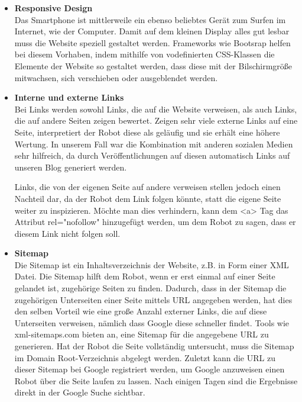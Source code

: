 {\begin{itemize}
      \item \textbf{Responsive Design}\\
        Das Smartphone ist mittlerweile ein ebenso beliebtes Gerät zum Surfen im Internet, wie der Computer. Damit auf dem kleinen Display alles gut lesbar muss die Website speziell
        gestaltet werden. Frameworks wie Bootsrap helfen bei diesem Vorhaben, indem mithilfe von vodefinierten CSS-Klassen die Elemente der Website so gestaltet werden, dass diese mit der
        Bilschirmgröße mitwachsen, sich verschieben oder ausgeblendet werden.

      \item \textbf{Interne und externe Links}\\
        Bei Links werden sowohl Links, die auf die Website verweisen, als auch Links, die auf andere Seiten zeigen bewertet.
        Zeigen sehr viele externe Links auf eine Seite, interpretiert der Robot diese als geläufig und sie erhält eine höhere Wertung. In unserem Fall war die Kombination mit anderen sozialen
        Medien sehr hilfreich, da durch Veröffentlichungen auf diesen automatisch Links auf unseren Blog generiert werden.

        Links, die von der eigenen Seite auf andere verweisen stellen jedoch einen Nachteil dar, da der Robot dem Link folgen könnte, statt die eigene Seite weiter zu inspizieren. Möchte man dies
        verhindern, kann dem <a> Tag das Attribut rel="nofollow" hinzugefügt werden, um dem Robot zu sagen, dass er diesem Link nicht folgen soll.

      \item \textbf{Sitemap}\\
      	Die Sitemap ist ein Inhaltsverzeichnis der Website, z.B. in Form einer XML Datei. Die Sitemap hilft dem Robot, wenn er erst einmal auf einer Seite gelandet ist, zugehörige Seiten
        zu finden. Dadurch, dass in der Sitemap die zugehörigen Unterseiten einer Seite mittels URL angegeben werden, hat dies den selben Vorteil wie eine große Anzahl externer Links, die auf diese
        Unterseiten verweisen, nämlich dass Google diese schneller findet. Tools wie xml-sitemaps.com bieten an, eine Sitemap für die angegebene URL zu generieren. Hat der Robot die Seite vollständig
        untersucht, muss die Sitemap im Domain Root-Verzeichnis abgelegt werden. Zuletzt kann die URL zu dieser Sitemap bei Google registriert werden, um Google anzuweisen einen Robot über die Seite
        laufen zu lassen. Nach einigen Tagen sind die Ergebnisse direkt in der Google Suche sichtbar.


\end{itemize}}
